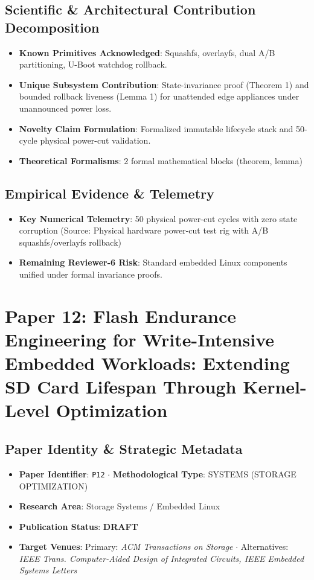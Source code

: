 \documentclass[11pt,a4paper]{article}
\begin{document}
\subsection*{Scientific & Architectural Contribution Decomposition}
\begin{itemize}[leftmargin=1.5em, itemsep=0.2em]
    \item \textbf{Known Primitives Acknowledged}: Squashfs, overlayfs, dual A/B partitioning, U-Boot watchdog rollback.
    \item \textbf{Unique Subsystem Contribution}: State-invariance proof (Theorem 1) and bounded rollback liveness (Lemma 1) for unattended edge appliances under unannounced power loss.
    \item \textbf{Novelty Claim Formulation}: Formalized immutable lifecycle stack and 50-cycle physical power-cut validation.
    \item \textbf{Theoretical Formalisms}: 2 formal mathematical blocks (theorem, lemma)
\end{itemize}

\subsection*{Empirical Evidence & Telemetry}
\begin{itemize}[leftmargin=1.5em, itemsep=0.2em]
    \item \textbf{Key Numerical Telemetry}: 50 physical power-cut cycles with zero state corruption (Source: Physical hardware power-cut test rig with A/B squashfs/overlayfs rollback)
    \item \textbf{Remaining Reviewer-6 Risk}: Standard embedded Linux components unified under formal invariance proofs.
\end{itemize}

\section{Paper 12: Flash Endurance Engineering for Write-Intensive Embedded Workloads: Extending SD Card Lifespan Through Kernel-Level Optimization}

\subsection*{Paper Identity \& Strategic Metadata}
\begin{itemize}[leftmargin=1.5em, itemsep=0.2em]
    \item \textbf{Paper Identifier}: \texttt{P12} $\cdot$ \textbf{Methodological Type}: SYSTEMS (STORAGE OPTIMIZATION)
    \item \textbf{Research Area}: Storage Systems / Embedded Linux
    \item \textbf{Publication Status}: \textbf{DRAFT}
    \item \textbf{Target Venues}: Primary: \textit{ACM Transactions on Storage} $\cdot$ Alternatives: \textit{IEEE Trans. Computer-Aided Design of Integrated Circuits, IEEE Embedded Systems Letters}
\end{itemize}
\end{document}
